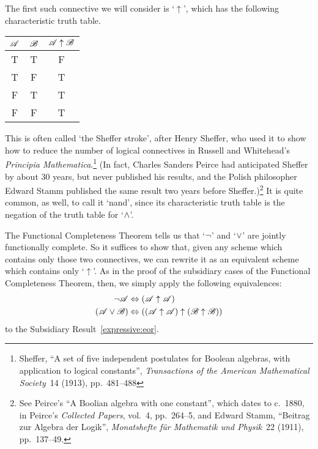 The first such connective we will consider is `$\uparrow$', which has the following characteristic truth table.
\begin{center}
\begin{tabular}{c c | c}
$\mathscr{A}$ & $\mathscr{B}$ & $\mathscr{A} \mathrel{\uparrow} \mathscr{B}$\\
\hline
 T & T & F \\
 T & F & T \\
 F & T & T  \\
 F & F & T
\end{tabular}
\end{center}
 This is often called `the Sheffer stroke', after Henry Sheffer, who
 used it to show how to reduce the number of logical connectives in
 Russell and Whitehead's \textit{Principia
 Mathematica}.\footnote{Sheffer, ``A set of five independent
 postulates for Boolean algebras, with application to logical
 constants'', \textit{Transactions of the American Mathematical
 Society}~14 (1913), pp.~481--488} (In fact, Charles Sanders Peirce
 had anticipated Sheffer by about 30 years, but never published his
 results, and the Polish philosopher Edward Stamm published the same
 result two years before Sheffer.)\footnote{See Peirce's ``A Boolian
 algebra with one constant'', which dates to c.~1880, in Peirce's
 \textit{Collected Papers}, vol.~4, pp.~264--5, and Edward Stamm,
 ``\foreignlanguage{german}{Beitrag zur Algebra der Logik}'',
 \foreignlanguage{german}{\textit{Monatshefte für Mathematik und
 Physik}}~22 (1911), pp.~137--49.} It is quite common, as well, to
 call it `nand', since its characteristic truth table is the negation
 of the truth table for `$\wedge$'.

The Functional Completeness Theorem tells us that `$\neg$' and `$\vee$' are jointly functionally complete. So it suffices to show that, given any scheme which contains only those two connectives, we can rewrite it as an equivalent scheme which contains only `$\uparrow$'. As in the proof of the subsidiary cases of the Functional Completeness Theorem, then, we simply apply the following equivalences:
		\begin{align*}
			\neg \mathscr{A} &\Leftrightarrow (\mathscr{A} \uparrow \mathscr{A})\\
			(\mathscr{A} \vee \mathscr{B}) & \Leftrightarrow ((\mathscr{A} \uparrow \mathscr{A}) \uparrow (\mathscr{B} \uparrow \mathscr{B}))
		\end{align*}
to the Subsidiary Result~\ref*{expressive:eor}.

